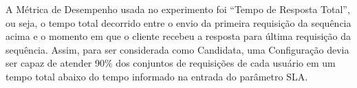 A Métrica de Desempenho usada no experimento foi ``Tempo de Resposta Total'', ou 
seja, o tempo total decorrido entre o envio da primeira requisição da sequência 
acima e o momento em que o cliente recebeu a resposta para última requisição da
sequência. Assim, para ser considerada como Candidata, uma Configuração devia 
ser capaz de atender 90\% dos conjuntos de requisições de cada usuário em um
tempo total abaixo do tempo informado na entrada do parâmetro SLA.


